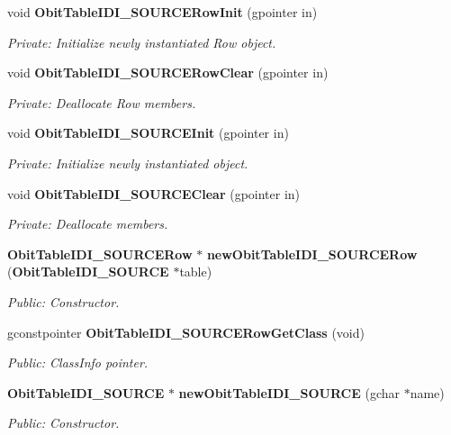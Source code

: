 \begin{CompactItemize}
\item 
void {\bf Obit\-Table\-IDI\_\-SOURCERow\-Init} (gpointer in)
\begin{CompactList}\small\item\em Private: Initialize newly instantiated Row object. \item\end{CompactList}\item 
void {\bf Obit\-Table\-IDI\_\-SOURCERow\-Clear} (gpointer in)
\begin{CompactList}\small\item\em Private: Deallocate Row members. \item\end{CompactList}\item 
void {\bf Obit\-Table\-IDI\_\-SOURCEInit} (gpointer in)
\begin{CompactList}\small\item\em Private: Initialize newly instantiated object. \item\end{CompactList}\item 
void {\bf Obit\-Table\-IDI\_\-SOURCEClear} (gpointer in)
\begin{CompactList}\small\item\em Private: Deallocate members. \item\end{CompactList}\item 
{\bf Obit\-Table\-IDI\_\-SOURCERow} $\ast$ {\bf new\-Obit\-Table\-IDI\_\-SOURCERow} ({\bf Obit\-Table\-IDI\_\-SOURCE} $\ast$table)
\begin{CompactList}\small\item\em Public: Constructor. \item\end{CompactList}\item 
gconstpointer {\bf Obit\-Table\-IDI\_\-SOURCERow\-Get\-Class} (void)
\begin{CompactList}\small\item\em Public: Class\-Info pointer. \item\end{CompactList}\item 
{\bf Obit\-Table\-IDI\_\-SOURCE} $\ast$ {\bf new\-Obit\-Table\-IDI\_\-SOURCE} (gchar $\ast$name)
\begin{CompactList}\small\item\em Public: Constructor. \item\end{CompactList}\item 

\end{CompactItemize}
